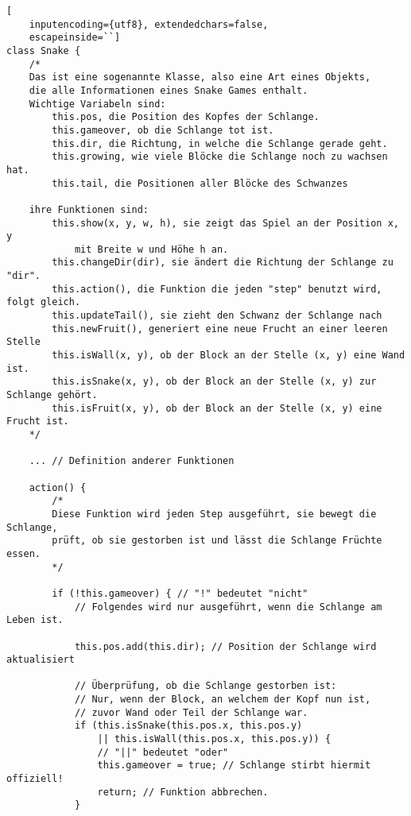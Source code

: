 \documentclass[11pt,a4paper,ngerman]{article}
\begin{document}
\begin{lstlisting}[
    inputencoding={utf8}, extendedchars=false,  
    escapeinside=``]
class Snake { 
    /* 
    Das ist eine sogenannte Klasse, also eine Art eines Objekts,
    die alle Informationen eines Snake Games enthalt. 
    Wichtige Variabeln sind:
        this.pos, die Position des Kopfes der Schlange.
        this.gameover, ob die Schlange tot ist.
        this.dir, die Richtung, in welche die Schlange gerade geht.
        this.growing, wie viele Blöcke die Schlange noch zu wachsen hat.
        this.tail, die Positionen aller Blöcke des Schwanzes

    ihre Funktionen sind:
        this.show(x, y, w, h), sie zeigt das Spiel an der Position x, y 
            mit Breite w und Höhe h an.
        this.changeDir(dir), sie ändert die Richtung der Schlange zu "dir".
        this.action(), die Funktion die jeden "step" benutzt wird, folgt gleich.
        this.updateTail(), sie zieht den Schwanz der Schlange nach
        this.newFruit(), generiert eine neue Frucht an einer leeren Stelle
        this.isWall(x, y), ob der Block an der Stelle (x, y) eine Wand ist.
        this.isSnake(x, y), ob der Block an der Stelle (x, y) zur Schlange gehört.
        this.isFruit(x, y), ob der Block an der Stelle (x, y) eine Frucht ist.
    */

    ... // Definition anderer Funktionen

    action() {
        /*
        Diese Funktion wird jeden Step ausgeführt, sie bewegt die Schlange, 
        prüft, ob sie gestorben ist und lässt die Schlange Früchte essen.
        */

        if (!this.gameover) { // "!" bedeutet "nicht"
            // Folgendes wird nur ausgeführt, wenn die Schlange am Leben ist.

            this.pos.add(this.dir); // Position der Schlange wird aktualisiert

            // Überprüfung, ob die Schlange gestorben ist:
            // Nur, wenn der Block, an welchem der Kopf nun ist, 
            // zuvor Wand oder Teil der Schlange war.
            if (this.isSnake(this.pos.x, this.pos.y) 
                || this.isWall(this.pos.x, this.pos.y)) { 
                // "||" bedeutet "oder"
                this.gameover = true; // Schlange stirbt hiermit offiziell!
                return; // Funktion abbrechen.
            }


\end{lstlisting}
\end{document}
